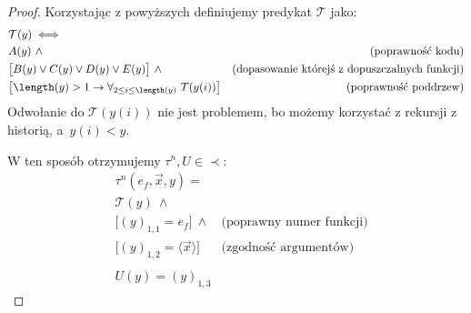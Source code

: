\begin{proof}
    Korzystając z powyższych definiujemy predykat \( \mathcal{T} \) jako:
    \begin{align*}
        & \mathcal{T}(y) \iff \\
        & A(y) \ \land & \text{(poprawność kodu)} \\
        & \big[ B(y) \lor C(y) \lor D(y) \lor E(y) \big] \ \land & \text{(dopasowanie którejś z dopuszczalnych funkcji)} \\
        & \big[ \length(y) > 1 \rightarrow \forall_{2 \leq i \leq \length(y)} \ T(y(i)) \big] & \text{(poprawność poddrzew)} \\
    \end{align*}
    Odwołanie do \( \mathcal{T}(y(i)) \) nie jest problemem, bo możemy korzystać z rekursji z historią, a~\( y(i) <  y \).

    W ten sposób otrzymujemy \(\tau^n, U \in \prec\):
    \begin{align*}
        & \tau^n(e_f, \vec{x}, y) = \\
        & \mathcal{T}(y) \ \land \\
        & \big[ (y)_{1,1} = e_f \big] \ \land & \text{(poprawny numer funkcji)} \\
        & \big[ (y)_{1,2} = \langle \vec{x} \rangle \big] & \text{(zgodność argumentów)} \\ \\
        & U(y) = (y)_{1,3}
    \end{align*}
\end{proof}